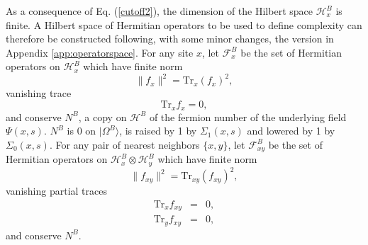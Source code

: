 \documentclass[twocolumn,amsmath,amssymb]{revtex4-1}
\begin{document}
As a consequence of Eq. (\ref{cutoff2}), the dimension of
the Hilbert space $\mathcal{H}^B_x$ is finite.
A Hilbert space of Hermitian operators to be used to
define complexity can therefore be constructed following,
with some minor changes, the version
in Appendix \ref{app:operatorspace}.
For any site $x$, let $\mathcal{F}^B_x$ be the set of Hermitian operators on
$\mathcal{H}^B_x$ which have finite norm
\begin{equation}
  \label{normfxx}
  \parallel f_x \parallel ^ 2 = \mathrm{Tr}_x( f_x)^2,
\end{equation}
vanishing trace 
\begin{equation}
  \label{trx0x}
  \mathrm{Tr}_x f_x  = 0,
\end{equation}
and conserve $N^B$, a copy on $\mathcal{H}^B$ of the 
fermion number of the underlying field $\Psi(x, s)$.
$N^B$ is 0 on $|\Omega^B \rangle $, is raised by 1 
by $\Sigma_1( x, s)$ and lowered by
1 by $\Sigma_0( x, s)$.
For any pair of nearest neighbors $\{x,y\}$,
let $\mathcal{F}^B_{xy}$ be the
set of Hermitian operators on $\mathcal{H}^B_x \otimes \mathcal{H}^B_y$
which have finite norm 
\begin{equation}
  \label{normfxyx}
  \parallel f_{xy} \parallel ^ 2 = \mathrm{Tr}_{xy}( f_{xy})^2,
\end{equation}
vanishing partial traces 
\begin{subequations}
\begin{eqnarray}
  \label{trx1x}
  \mathrm{Tr}_x f_{xy}  &=& 0, \\
  \label{try1x}
  \mathrm{Tr}_y f_{xy}  &=& 0,
\end{eqnarray}
\end{subequations}
and conserve $N^B$.
\end{document}
